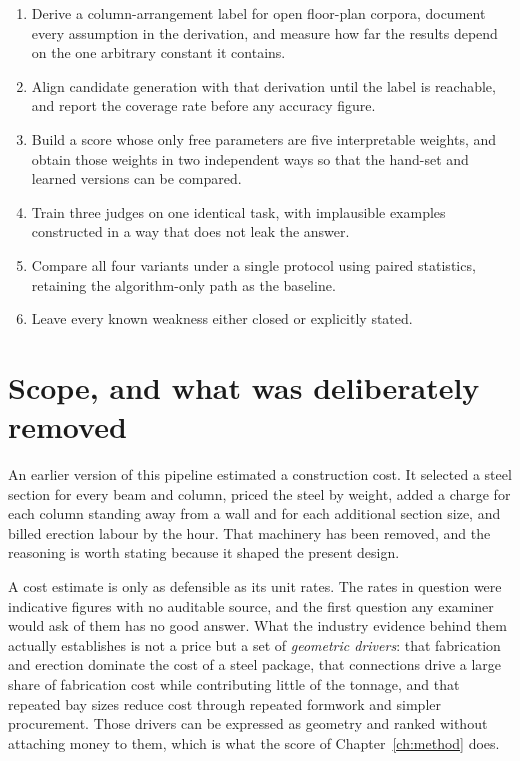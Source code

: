 \begin{enumerate}
\item Derive a column-arrangement label for open floor-plan corpora,
document every assumption in the derivation, and measure how far the
results depend on the one arbitrary constant it contains.
\item Align candidate generation with that derivation until the label is
reachable, and report the coverage rate before any accuracy figure.
\item Build a score whose only free parameters are five interpretable
weights, and obtain those weights in two independent ways so that the
hand-set and learned versions can be compared.
\item Train three judges on one identical task, with implausible examples
constructed in a way that does not leak the answer.
\item Compare all four variants under a single protocol using paired
statistics, retaining the algorithm-only path as the baseline.
\item Leave every known weakness either closed or explicitly stated.
\end{enumerate}

\section{Scope, and what was deliberately removed}
\label{sec:removals}

An earlier version of this pipeline estimated a construction cost. It
selected a steel section for every beam and column, priced the steel by
weight, added a charge for each column standing away from a wall and for
each additional section size, and billed erection labour by the hour. That
machinery has been removed, and the reasoning is worth stating because it
shaped the present design.

A cost estimate is only as defensible as its unit rates. The rates in
question were indicative figures with no auditable source, and the first
question any examiner would ask of them has no good answer. What the
industry evidence behind them actually establishes is not a price but a
set of \emph{geometric drivers}: that fabrication and erection dominate
the cost of a steel package, that connections drive a large share of
fabrication cost while contributing little of the tonnage, and that
repeated bay sizes reduce cost through repeated formwork and simpler
procurement. Those drivers can be expressed as geometry and ranked without
attaching money to them, which is what the score of
Chapter~\ref{ch:method} does.

